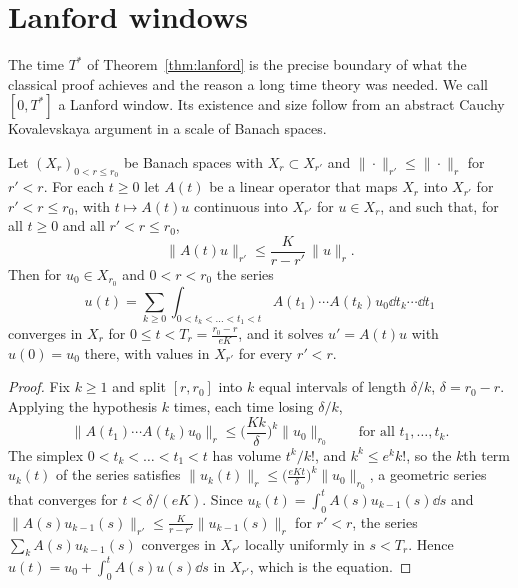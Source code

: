 \section{Lanford windows}

The time $T^*$ of Theorem~\ref{thm:lanford} is the precise boundary of what the classical proof achieves and the reason a long time theory was needed. We call $[0,T^*]$ a Lanford window. Its existence and size follow from an abstract Cauchy Kovalevskaya argument in a scale of Banach spaces.

\begin{lemma}
\label{lem:cauchy_kovalevskaya}
Let $(X_r)_{0<r\leq r_0}$ be Banach spaces with $X_r\subset X_{r'}$ and $\|\cdot\|_{r'}\leq\|\cdot\|_r$ for $r'<r$. For each $t\geq0$ let $A(t)$ be a linear operator that maps $X_r$ into $X_{r'}$ for $r'<r\leq r_0$, with $t\mapsto A(t)u$ continuous into $X_{r'}$ for $u\in X_r$, and such that, for all $t\geq0$ and all $r'<r\leq r_0$,
\[
\|A(t)u\|_{r'}\leq\frac{K}{r-r'}\,\|u\|_r.
\]
Then for $u_0\in X_{r_0}$ and $0<r<r_0$ the series
\[
u(t) = \sum_{k\geq0}\int_{0<t_k<\dots<t_1<t}A(t_1)\cdots A(t_k)u_0\dd t_k\cdots\dd t_1
\]
converges in $X_r$ for $0\leq t<T_r = \frac{r_0-r}{eK}$, and it solves $u' = A(t)u$ with $u(0) = u_0$ there, with values in $X_{r'}$ for every $r'<r$.
\end{lemma}

\begin{proof}
Fix $k\geq1$ and split $[r,r_0]$ into $k$ equal intervals of length $\delta/k$, $\delta = r_0-r$. Applying the hypothesis $k$ times, each time losing $\delta/k$,
\[
\|A(t_1)\cdots A(t_k)u_0\|_r\leq\Big(\frac{Kk}{\delta}\Big)^k\|u_0\|_{r_0}\qquad\text{for all }t_1,\dots,t_k.
\]
The simplex $0<t_k<\dots<t_1<t$ has volume $t^k/k!$, and $k^k\leq e^kk!$, so the $k$th term $u_k(t)$ of the series satisfies $\|u_k(t)\|_r\leq\big(\frac{eKt}{\delta}\big)^k\|u_0\|_{r_0}$, a geometric series that converges for $t<\delta/(eK)$. Since $u_k(t) = \int_0^tA(s)u_{k-1}(s)\dd s$ and $\|A(s)u_{k-1}(s)\|_{r'}\leq\frac{K}{r-r'}\|u_{k-1}(s)\|_r$ for $r'<r$, the series $\sum_kA(s)u_{k-1}(s)$ converges in $X_{r'}$ locally uniformly in $s<T_r$. Hence $u(t) = u_0+\int_0^tA(s)u(s)\dd s$ in $X_{r'}$, which is the equation.
\end{proof}

